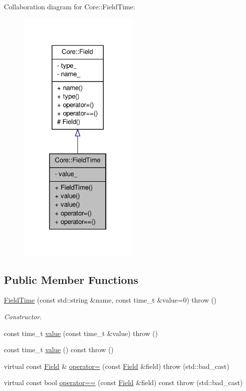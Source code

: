 Collaboration diagram for Core::FieldTime:
\nopagebreak
\begin{figure}[H]
\begin{center}
\leavevmode
\includegraphics[width=166pt]{d7/d8c/classCore_1_1FieldTime__coll__graph}
\end{center}
\end{figure}
\subsection*{Public Member Functions}
\begin{DoxyCompactItemize}
\item 
\hyperlink{classCore_1_1FieldTime_ad1b0b00de785462e57fd625d1ef6beb6}{FieldTime} (const std::string \&name, const time\_\-t \&value=0)  throw ()
\begin{DoxyCompactList}\small\item\em Constructor. \item\end{DoxyCompactList}\item 
const time\_\-t \hyperlink{classCore_1_1FieldTime_aeaf4283ac92d2a718d6225a717073a17}{value} (const time\_\-t \&value)  throw ()
\item 
const time\_\-t \hyperlink{classCore_1_1FieldTime_aca53dd5590b476699aeb670068b4592e}{value} () const   throw ()
\item 
virtual const \hyperlink{classCore_1_1Field}{Field} \& \hyperlink{classCore_1_1FieldTime_ab0b9e7fe5ee619d3d584dfd3a9be5015}{operator=} (const \hyperlink{classCore_1_1Field}{Field} \&field)  throw (std::bad\_\-cast)
\item 
virtual const bool \hyperlink{classCore_1_1FieldTime_aa48c2e4d7c6ad13794f66f3e59849843}{operator==} (const \hyperlink{classCore_1_1Field}{Field} \&field) const   throw (std::bad\_\-cast)
\end{DoxyCompactItemize}


